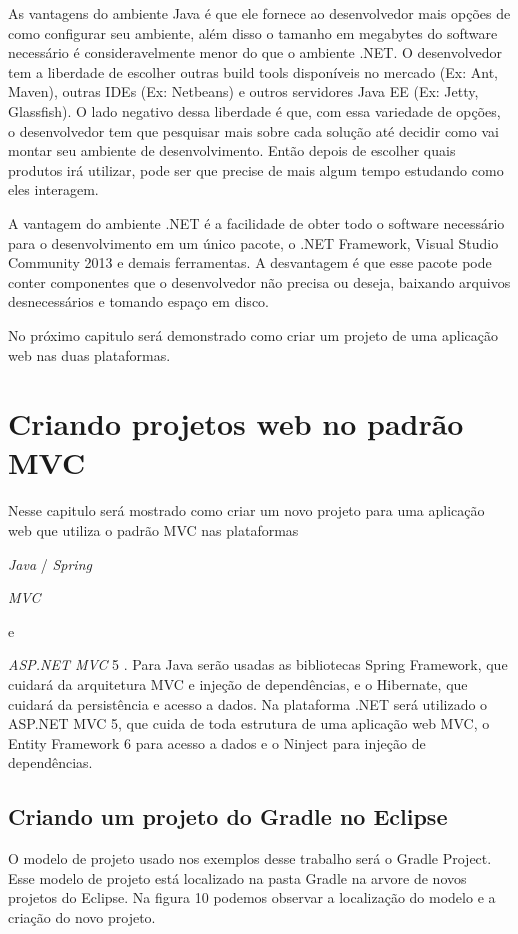 \documentclass[a4paper,12pt]{article}
\newcommand{\anmvc} {
	\sigla{ASP.NET MVC} 5
}
\newcommand{\spring} {
	\lang{Java}/\est{Spring} \sigla{MVC}
}
\newcommand{\est}[1] {
	\textit{#1}
}
\newcommand{\sigla}[1] {
	\textit{#1}
}
\newcommand{\lang}[1] {
	\textit{#1}
}
\begin{document}
As vantagens do ambiente Java é que ele fornece ao desenvolvedor mais opções de como configurar seu ambiente, além disso o tamanho em megabytes do software necessário é consideravelmente menor do que o ambiente .NET. O desenvolvedor tem a liberdade de escolher outras build tools disponíveis no mercado (Ex: Ant, Maven), outras IDEs (Ex: Netbeans) e outros servidores Java EE (Ex: Jetty, Glassfish). O lado negativo dessa liberdade é que, com  essa variedade de opções, o desenvolvedor tem que pesquisar mais sobre cada solução até decidir como vai montar seu ambiente de desenvolvimento. Então depois de escolher quais produtos irá utilizar, pode ser que precise de mais algum tempo estudando como eles interagem.

A vantagem do ambiente .NET é a facilidade de obter todo o software necessário para o desenvolvimento em um único pacote, o .NET Framework, Visual Studio Community 2013 e demais ferramentas. A desvantagem é que esse pacote pode conter componentes que o desenvolvedor não precisa ou deseja, baixando arquivos desnecessários e tomando espaço em disco.

No próximo capitulo será demonstrado como criar um projeto de uma aplicação web nas duas plataformas.

\section{Criando projetos web no padrão MVC}

Nesse capitulo será mostrado como criar um novo projeto para uma aplicação web que utiliza o padrão MVC nas plataformas \spring e \anmvc. Para Java serão usadas as bibliotecas Spring Framework, que cuidará da arquitetura MVC e injeção de dependências, e o Hibernate, que cuidará da persistência e acesso a dados. Na plataforma .NET será utilizado o ASP.NET MVC 5, que cuida de toda estrutura de uma aplicação web MVC, o Entity Framework 6 para acesso a dados e o Ninject para injeção de dependências.

\subsection{Criando um projeto do Gradle no Eclipse}

O modelo de projeto usado nos exemplos desse trabalho será o Gradle Project. Esse modelo de projeto está localizado na pasta Gradle na arvore de novos projetos do Eclipse. Na figura 10 podemos observar a localização do modelo e a criação do novo projeto.
\end{document}
